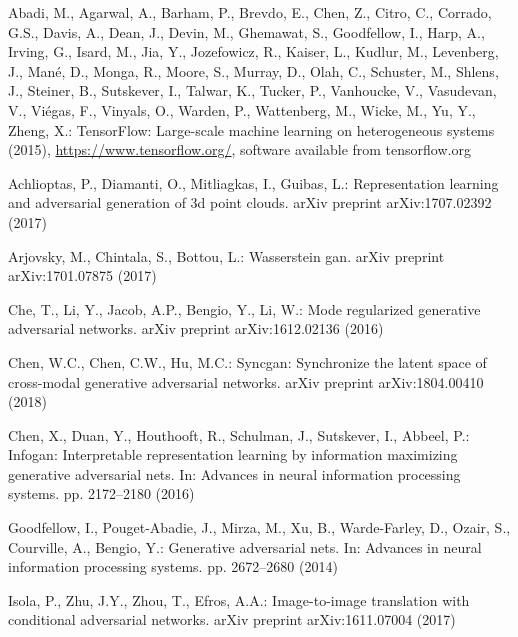 \documentclass[runningheads]{llncs}
\begin{document}
\clearpage
%
%
%
\begin{thebibliography}{10}

Abadi, M., Agarwal, A., Barham, P., Brevdo, E., Chen, Z., Citro, C., Corrado,
   G.S., Davis, A., Dean, J., Devin, M., Ghemawat, S., Goodfellow, I.,  
Harp, A.,
   Irving, G., Isard, M., Jia, Y., Jozefowicz, R., Kaiser, L., Kudlur, M.,
   Levenberg, J., Man\'{e}, D., Monga, R., Moore, S., Murray, D., Olah, C.,
   Schuster, M., Shlens, J., Steiner, B., Sutskever, I., Talwar, K.,  
Tucker, P.,
   Vanhoucke, V., Vasudevan, V., Vi\'{e}gas, F., Vinyals, O., Warden, P.,
   Wattenberg, M., Wicke, M., Yu, Y., Zheng, X.: {TensorFlow}: Large-scale
   machine learning on heterogeneous systems (2015),
   \url{https://www.tensorflow.org/}, software available from tensorflow.org

Achlioptas, P., Diamanti, O., Mitliagkas, I., Guibas, L.: Representation
   learning and adversarial generation of 3d point clouds. arXiv preprint
   arXiv:1707.02392  (2017)

Arjovsky, M., Chintala, S., Bottou, L.: Wasserstein gan. arXiv preprint
   arXiv:1701.07875  (2017)

Che, T., Li, Y., Jacob, A.P., Bengio, Y., Li, W.: Mode regularized generative
   adversarial networks. arXiv preprint arXiv:1612.02136  (2016)

Chen, W.C., Chen, C.W., Hu, M.C.: Syncgan: Synchronize the latent space of
   cross-modal generative adversarial networks. arXiv preprint arXiv:1804.00410
   (2018)

Chen, X., Duan, Y., Houthooft, R., Schulman, J., Sutskever, I., Abbeel, P.:
   Infogan: Interpretable representation learning by information maximizing
   generative adversarial nets. In: Advances in neural information processing
   systems. pp. 2172--2180 (2016)

Goodfellow, I., Pouget-Abadie, J., Mirza, M., Xu, B., Warde-Farley, D., Ozair,
   S., Courville, A., Bengio, Y.: Generative adversarial nets. In: Advances in
   neural information processing systems. pp. 2672--2680 (2014)

Isola, P., Zhu, J.Y., Zhou, T., Efros, A.A.: Image-to-image translation with
   conditional adversarial networks. arXiv preprint arXiv:1611.07004 (2017)


\end{thebibliography}
\end{document}

